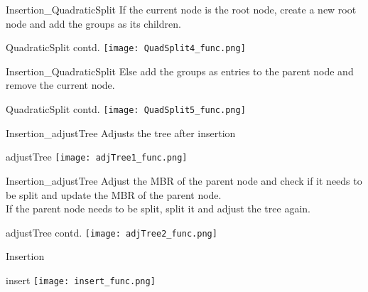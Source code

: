 \documentclass{beamer}
\begin{document}
\begin{frame}{Insertion_{QuadraticSplit}}
If the current node is the root node, create a new root node and add the groups as its children.
    \begin{block}{QuadraticSplit contd.}
       \texttt{[image: QuadSplit4\_func.png]}
    \end{block}
\end{frame}
\begin{frame}{Insertion_{QuadraticSplit}}
Else add the groups as entries to the parent node and remove the current node.
    \begin{block}{QuadraticSplit contd.}
       \texttt{[image: QuadSplit5\_func.png]}
    \end{block}
\end{frame}
\begin{frame}{Insertion_{adjustTree}}
Adjusts the tree after insertion
    \begin{block}{adjustTree}
       \texttt{[image: adjTree1\_func.png]}
    \end{block}
\end{frame}
\begin{frame}{Insertion_{adjustTree}}
Adjust the MBR of the parent node and check if it needs to be split and update the MBR of the parent node.\\
\bigskip
If the parent node needs to be split, split it and adjust the tree again.
    \begin{block}{adjustTree contd.}
       \texttt{[image: adjTree2\_func.png]}
    \end{block}
\end{frame}
\begin{frame}{Insertion}
    \begin{block}{insert}
       \texttt{[image: insert\_func.png]}
    \end{block}
\end{frame}
\end{document}
